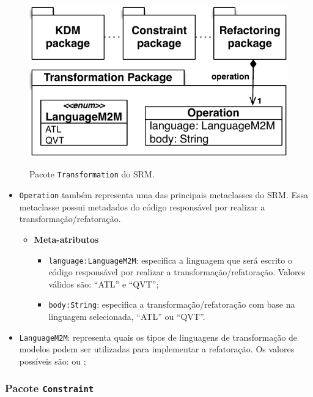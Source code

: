 \begin{figure}[h]
	\centering
		\caption{Pacote \texttt{Transformation} do SRM.}
	\includegraphics[scale=0.70]{images/TransformationPackageSRM4}
	\label{fig:pacote_transformation_srm}
	\fautor
\end{figure}

\begin{itemize}
    \item \texttt{Operation} também representa uma das principais metaclasses do SRM. Essa metaclasse possui metadados do código responsável por realizar a transformação/refatoração.

\begin{itemize}
	\item \textbf{Meta-atributos}
		\begin{itemize}
			\item \texttt{language:LanguageM2M}: especifica a linguagem que será escrito o código responsável por realizar a transformação/refatoração. Valores válidos são: ``ATL'' e ``QVT'';
			\item \texttt{body:String}: especifica a transformação/refatoração com base na linguagem selecionada, ``ATL'' ou ``QVT''.
		\end{itemize}	
\end{itemize}
     
     \item \texttt{LanguageM2M}: representa quais os tipos de linguagens de transformação de modelos podem ser utilizadas para implementar a refatoração. Os valores possíveis são:  ou ;
     
\end{itemize}

\subsubsection{Pacote \texttt{Constraint}}

